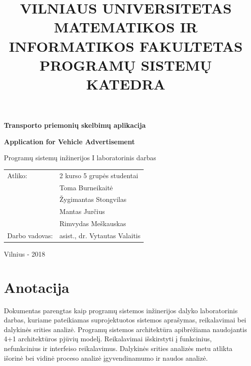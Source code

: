 \documentclass[12pt]{article}
\title{VILNIAUS UNIVERSITETAS \\
MATEMATIKOS IR INFORMATIKOS FAKULTETAS \\
PROGRAMŲ SISTEMŲ KATEDRA}
\author{}
\date{}
\renewcommand{\baselinestretch}{1.5}
\begin{document}
	\clearpage
	\maketitle
	\thispagestyle{empty}

	\bigbreak
	\bigbreak
	\bigbreak
	\bigbreak

	\begin{center}
		\begin{Large}
			\textbf{Transporto priemonių skelbimų aplikacija} \\
		\end{Large}
		\begin{large}
			\textbf{Application for Vehicle Advertisement} \\
		\end{large}
		Programų sistemų inžinerijos I laboratorinis darbas \\

		\bigbreak
		\bigbreak
		\bigbreak
		\bigbreak
		\bigbreak
		\bigbreak
		\bigbreak
		\bigbreak
		\bigbreak

		\begin{tabular}{ll}
			Atliko:        & 2 kurso 5 grupės studentai \\
		               	   & Toma Burneikaitė \\
		               	   & Žygimantas Stongvilas \\
		                   & Mantas Jurčius \\
		                   & Rimvydas Meškauskas \\
			Darbo vadovas: & asist., dr. Vytautas Valaitis
		\end{tabular}

		\bigbreak
		\bigbreak
		\bigbreak
		\bigbreak
		\bigbreak
		\bigbreak
		\bigbreak
		\bigbreak
		\bigbreak

		Vilnius - 2018
	\end{center}
	\pagebreak
	
	\renewcommand{\baselinestretch}{0.5}
	\tableofcontents
	\renewcommand{\baselinestretch}{1.5}
	\pagebreak	
	
	\part*{Anotacija}
	\begin{indent}
	Dokumentas parengtas kaip programų sistemos inžinerijos dalyko laboratorinis darbas, kuriame pateikiamas suprojektuotos sistemos aprašymas, reikalavimai bei dalykinės srities analizė. Programų sistemos architektūra apibrėžiama naudojantis 4+1 architektūros pjūvių modelį. Reikalavimai išskirstyti į funkcinius, nefunkcinius ir interfeiso reikalavimus. Dalykinės srities analizės metu atlikta išorinė bei vidinė proceso analizė įgyvendinamumo ir naudos analizė.
	\end{indent}
	\pagebreak
	
\end{document}
